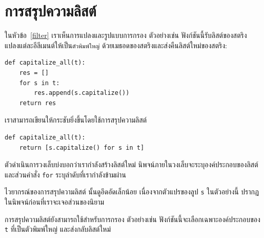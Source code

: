 \section{การสรุปความลิสต์ } %

ในหัวข้อ~\ref{filter} เราเห็นการแปลงและรูปแบบการกรอง ตัวอย่างเช่น ฟังก์ชันนี้รับลิสต์ของสตริง แปลงแต่ละอีลีเมนต์ให้เป็น{\tt ตัวพิมพ์ใหญ่} ด้วยเมธอดของสตริงและส่งคืนลิสต์ใหม่ของสตริง:

\begin{verbatim}
def capitalize_all(t):
    res = []
    for s in t:
        res.append(s.capitalize())
    return res
\end{verbatim}

เราสามารถเขียนให้กระชับยิ่งขึ้นโดยใช้การสรุปความลิสต์

\begin{verbatim}
def capitalize_all(t):
    return [s.capitalize() for s in t]
\end{verbatim}

ตัวดำเนินการวงเล็บบ่งบอกว่าเรากำลังสร้างลิสต์ใหม่ นิพจน์ภายในวงเล็บจะระบุองค์ประกอบของลิสต์ และส่วนคำสั่ง {\tt for} ระบุลำดับที่เรากำลังข้ามผ่าน

ไวยากรณ์ของการสรุปความลิสต์ นั้นดูอึดอัดเล็กน้อย เนื่องจากตัวแปรของลูป  {\tt s} ในตัวอย่างนี้ ปรากฏในนิพจน์ก่อนที่เราจะเจอส่วนของนิยาม

การสรุปความลิสต์ยังสามารถใช้สำหรับการกรอง ตัวอย่างเช่น ฟังก์ชันนี้จะเลือกเฉพาะองค์ประกอบของ {\tt t} ที่เป็นตัวพิมพ์ใหญ่ และส่งกลับลิสต์ใหม่

